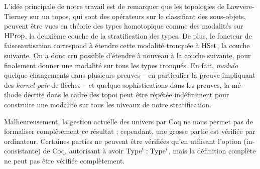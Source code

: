 \begin{otherlanguage}{french}
L'idée principale de notre travail est de remarquer que les topologies
de Lawvere-Tierney sur un topos, qui sont des opérateurs sur le
classifiant des sous-objets, peuvent être vues en théorie des types
homotopique comme des modalités sur $\operatorname{HProp}$, la deuxième couche de la
stratification des types. De plus, le foncteur de faisceautisation
correspond à étendre cette modalité tronquée à $\operatorname{HSet}$, la couche
suivante. On a donc cru possible d'étendre à nouveau à la couche
suivante, \etc{} pour finalement donner une modalité sur tous les
types tronqués. En fait, {\em modulo} quelque changements dans
plusieurs preuves -- en particulier la preuve impliquant des {\em
  kernel pair} de flèches -- et quelque sophistications dans les
preuves, la méthode décrite dans le cadre des topoi peut être répétée
indéfiniment pour construire une modalité sur tous les niveaux de
notre stratification.

Malheureusement, la gestion actuelle des univers par Coq ne nous
permet pas de formaliser complètement ce résultat ; cependant, une
grosse partie est vérifiée par ordinateur. Certaines parties ne
peuvent être vérifiées qu'en utilisant l'option (inconsistante)
 de Coq, autorisant à avoir $\operatorname{Type}^i : \operatorname{Type}^i$,
mais la définition complète ne peut pas être vérifiée complètement. 

\end{otherlanguage}


